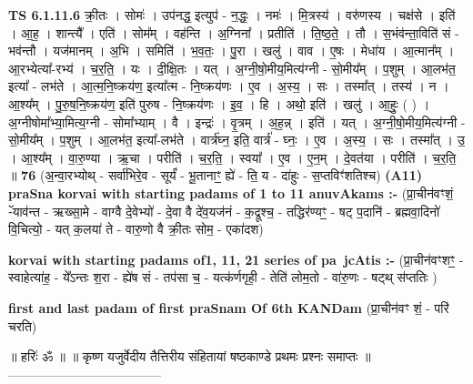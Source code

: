 \documentclass[17pt]{extarticle}
\begin{document}
                  \newline
                                \textbf{ TS 6.1.11.6} \newline
                  क्री॒तः । सोमः॑ । उप॑नद्ध॒ इत्युप॑ - न॒द्धः॒ । नमः॑ । मि॒त्रस्य॑ । वरु॑णस्य । चक्ष॑से । इति॑ । आ॒ह॒ । शान्त्यै᳚ । एति॑ । सोम᳚म् । वह॑न्ति । अ॒ग्निना᳚ । प्रतीति॑ । ति॒ष्ठ॒ते॒ । तौ । स॒भंव॑न्ता॒विति॑ सं - भव॑न्तौ । यज॑मानम् । अ॒भि । समिति॑ । भ॒व॒तः॒ । पु॒रा । खलु॑ । वाव । ए॒षः । मेधा॑य । आ॒त्मान᳚म् । आ॒रभ्येत्या᳚-रभ्य॑ । च॒र॒ति॒ । यः । दी॒क्षि॒तः । यत् । अ॒ग्नी॒षो॒मीय॒मित्य॑ग्नी - सो॒मीय᳚म् । प॒शुम् । आ॒लभ॑त॒ इत्या᳚ - लभ॑ते । आ॒त्म॒नि॒ष्क्रय॑ण॒ इत्या᳚त्म - नि॒ष्क्रय॑णः । ए॒व । अ॒स्य॒ । सः । तस्मा᳚त् । तस्य॑ । न । आ॒श्य᳚म् । पु॒रु॒ष॒नि॒ष्क्रय॑ण॒ इति॑ पुरुष - नि॒ष्क्रय॑णः । इ॒व॒ । हि । अथो॒ इति॑ । खलु॑ । आ॒हुः॒ ( ) । अ॒ग्नीषोमा᳚भ्या॒मित्य॒ग्नी - सोमा᳚भ्याम् । वै । इन्द्रः॑ । वृ॒त्रम् । अ॒ह॒न्न् । इति॑ । यत् । अ॒ग्नी॒षो॒मीय॒मित्य॑ग्नी - सो॒मीय᳚म् । प॒शुम् । आ॒लभ॑त॒ इत्या᳚-लभ॑ते । वार्त्र॑घ्न॒ इति॒ वार्त्र॑ - घ्नः॒ । ए॒व । अ॒स्य॒ । सः । तस्मा᳚त् । उ॒ । आ॒श्य᳚म् । वा॒रु॒ण्या । ऋ॒चा । परीति॑ । च॒र॒ति॒ । स्वया᳚ । ए॒व । ए॒न॒म् । दे॒वत॑या । परीति॑ । च॒र॒ति॒ ॥ \textbf{  76} \newline
                  \newline
                      (अ॒न्वा॒रभ्योथ् - सर्वा॑भिरे॒व - सूर्यं॑ - भू॒तानाꣳ॒॒ ह्ये॑ - ति॒ य - दा॑हुः - स॒प्तविꣳ॑शतिश्च)  \textbf{(A11)} \newline \newline
\textbf{praSna korvai with starting padams of 1 to 11 anuvAkams :-} \newline
(प्रा॒चीन॑वꣳशं॒ -ॅयाव॑न्त - ऋख्सा॒मे - वाग्वै दे॒वेभ्यो॑ - दे॒वा वै दे॑व॒यज॑नं - क॒द्रूश्च॒ - तद्धिर॑ण्यꣳ॒॒ - षट् प॒दानि॑ - ब्रह्मवा॒दिनो॑ वि॒चित्यो॒ - यत् क॒लया॑ ते - वारु॒णो वै क्री॒तः सोम॒ - एका॑दश) \newline

\textbf{korvai with starting padams of1, 11, 21 series of pa~jcAtis :-} \newline
(प्रा॒चीन॑वꣳशꣳ॒॒ - स्वाहेत्या॑ह॒ - ये᳚ऽन्तः श॒रा - ह्ये॑ष सं - तप॑सा च॒ - यत्क॑र्णगृही॒ - तेति॑ लोम॒तो - वा॑रु॒णः - षट्थ् स॑प्ततिः ) \newline

\textbf{first and last padam of first praSnam Of 6th KANDam} \newline
(प्रा॒चीन॑वꣳ शं॒ - परि॑ चरति) \newline 


॥ हरिः॑ ॐ ॥
॥ कृष्ण यजुर्वेदीय तैत्तिरीय संहितायां षष्ठकाण्डे प्रथमः प्रश्नः समाप्तः ॥
------------------------------------ \newline
\pagebreak
\pagebreak
        
\end{document}
